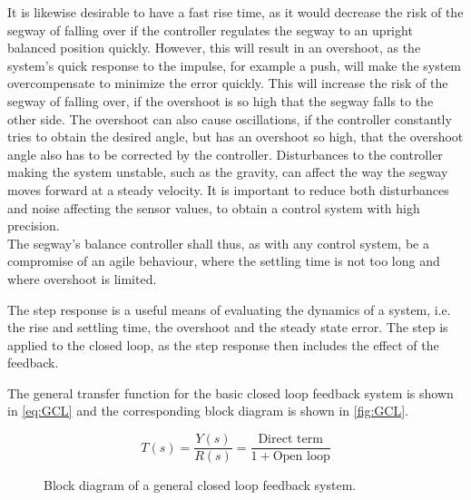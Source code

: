 It is likewise desirable to have a fast rise time, as it would decrease the risk of the segway of falling over if the controller regulates the segway to an upright balanced position quickly. However, this will result in an overshoot, as the system's quick response to the impulse, for example a push, will make the system overcompensate to minimize the error quickly. This will increase the risk of the segway of falling over, if the overshoot is so high that the segway falls to the other side. The overshoot can also cause oscillations, if the controller constantly tries to obtain the desired angle, but has an overshoot so high, that the overshoot angle also has to be corrected by the controller. Disturbances to the controller making the system unstable, such as the gravity, can affect the way the segway moves forward at a steady velocity. It is important to reduce both disturbances and noise affecting the sensor values, to obtain a control system with high precision.\\
The segway's balance controller shall thus, as with any control system, be a compromise of an agile behaviour, where the settling time is not too long and where overshoot is limited.

The step response is a useful means of evaluating the dynamics of a system, i.e. the rise and settling time, the overshoot and the steady state error. The step is applied to the closed loop, as the step response then includes the effect of the feedback.

The general transfer function for the basic closed loop feedback system is shown in \autoref{eq:GCL} and the corresponding block diagram is shown in \autoref{fig:GCL}. 

\begin{equation}
T(s) = \frac{Y(s)}{R(s)} = \frac{\text{Direct term}}{1 + \text{Open loop}}
\label{eq:GCL}
\end{equation}

\begin{figure}[H]
\centering

\caption{Block diagram of a general closed loop feedback system.}
\label{fig:GCL}
\end{figure}

